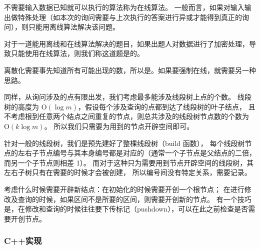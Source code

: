 \begin{definition}[在线算法] \label{def:online algorithm}
    \hspace{2em}不需要输入数据已知就可以执行的算法称为在线算法。
    一般而言，如果对输入输出做特殊处理（如本次的询问需要与上次执行的答案进行异或才能得到真正的询问），则只能用离线算法解决该问题。

    \hspace{2em}对于一道能用离线和在线算法解决的题目，如果出题人对数据进行了加密处理，导致只能使用在线算法，则我们称这道题是{}的。
\end{definition}

离散化需要事先知道所有可能出现的数，所以是{}。如果要强制在线，就需要另一种思路。

同样，从询问涉及的点有限出发，我们考虑最多能涉及线段树上点的个数。
线段树的高度为 $\mathrm{O}(\log m)$，假设每个涉及查询的点都到达了线段树的叶子结点，
且不考虑根到任意两个结点之间重复的节点，则总共涉及的线段树节点数的个数为 $\mathrm{O}(k\log m)$。
所以我们只需要为用到的节点开辟空间即可。

针对一般的线段树，我们是预先建好了整棵线段树（build 函数），
每个线段树节点的左右子节点编号与其本身编号都是对应的（通常一个子节点是父结点的二倍，而另一个子节点则相差 1）。
而对于这种只为需要用到节点开辟空间的线段树，其左右子树只有在需要的时候才会被创建，
所以编号间没有特定关系，需要记录。

考虑什么时候需要开辟新结点：在初始化的时候需要开创一个根节点；
在进行修改及查询的时候，如果区间不是所要的区间，则需要开创新的节点。
有一个技巧是，在修改和查询的时候往往要下传标记（pushdown），可以在此之前检查是否需要开创节点。

\subsubsection{C++实现}



